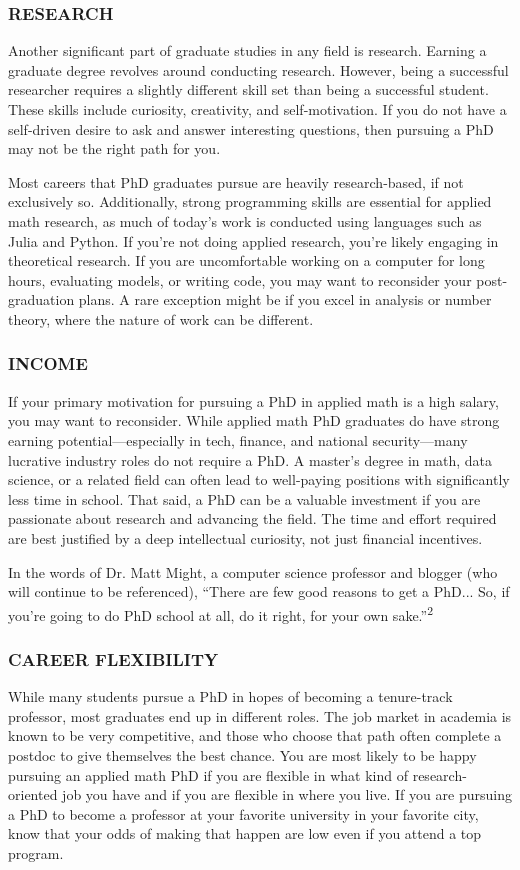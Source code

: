 \documentclass[11pt]{article}
\begin{document}
\subsubsection*{RESEARCH}
Another significant part of graduate studies in any field is research. Earning a graduate degree revolves around conducting research. However, being a successful researcher requires a slightly different skill set than being a successful student. These skills include curiosity, creativity, and self-motivation. If you do not have a self-driven desire to ask and answer interesting questions, then pursuing a PhD may not be the right path for you.

Most careers that PhD graduates pursue are heavily research-based, if not exclusively so. Additionally, strong programming skills are essential for applied math research, as much of today’s work is conducted using languages such as Julia and Python. If you’re not doing applied research, you’re likely engaging in theoretical research. If you are uncomfortable working on a computer for long hours, evaluating models, or writing code, you may want to reconsider your post-graduation plans. A rare exception might be if you excel in analysis or number theory, where the nature of work can be different.

\subsubsection*{INCOME}
If your primary motivation for pursuing a PhD in applied math is a high salary, you may want to reconsider. While applied math PhD graduates do have strong earning potential—especially in tech, finance, and national security—many lucrative industry roles do not require a PhD. A master’s degree in math, data science, or a related field can often lead to well-paying positions with significantly less time in school. That said, a PhD can be a valuable investment if you are passionate about research and advancing the field. The time and effort required are best justified by a deep intellectual curiosity, not just financial incentives.

In the words of Dr. Matt Might, a computer science professor and blogger (who will continue to be referenced), ``There are few good reasons to get a PhD... So, if you're going to do PhD school at all, do it right, for your own sake.''\textsuperscript{2}

\subsubsection*{CAREER FLEXIBILITY}
While many students pursue a PhD in hopes of becoming a tenure-track professor, most graduates end up in different roles. The job market in academia is known to be very competitive, and those who choose that path often complete a postdoc to give themselves the best chance. You are most likely to be happy pursuing an applied math PhD if you are flexible in what kind of research-oriented job you have and if you are flexible in where you live. If you are pursuing a PhD to become a professor at your favorite university in your favorite city, know that your odds of making that happen are low even if you attend a top program.
\end{document}

